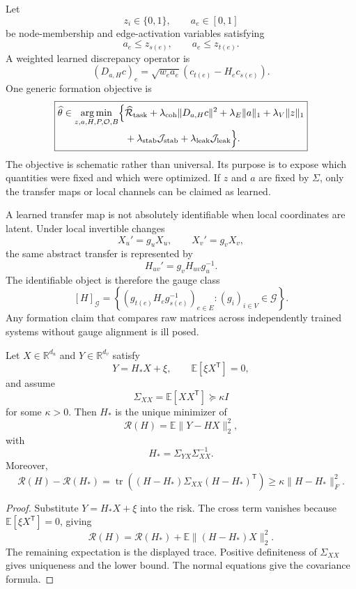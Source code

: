 Let
\[
z_i\in\{0,1\},
\qquad
a_e\in[0,1]
\]
be node-membership and edge-activation variables satisfying
\[
a_e\leq z_{s(e)},
\qquad
a_e\leq z_{t(e)}.
\]
A weighted learned discrepancy operator is
\[
(D_{a,H}c)_e
=
\sqrt{w_ea_e}
\left(
 c_{t(e)}-H_ec_{s(e)}
\right).
\]
One generic formation objective is
\[
\boxed{
\begin{aligned}
\widehat\theta
\in
\operatorname*{arg\,min}_{z,a,H,P,\mathcal O,B}
\Bigl
\{&
\widehat{\mathcal R}_{\mathrm{task}}
+
\lambda_{\mathrm{coh}}\|D_{a,H}c\|^2
+
\lambda_E\|a\|_1
+
\lambda_V\|z\|_1\\
&+
\lambda_{\mathrm{stab}}\mathcal J_{\mathrm{stab}}
+
\lambda_{\mathrm{leak}}\mathcal J_{\mathrm{leak}}
\Bigr\}.
\end{aligned}
}
\]
The objective is schematic rather than universal. Its purpose is to expose
which quantities were fixed and which were optimized. If \(z\) and \(a\) are
fixed by \(\Sigma\), only the transfer maps or local channels can be claimed as
learned.


A learned transfer map is not absolutely identifiable when local coordinates
are latent. Under local invertible changes
\[
X_u'=g_uX_u,
\qquad
X_v'=g_vX_v,
\]
the same abstract transfer is represented by
\[
H_{uv}'=g_vH_{uv}g_u^{-1}.
\]
The identifiable object is therefore the gauge class
\[
[H]_{\mathcal G}
=
\left\{
(g_{t(e)}H_eg_{s(e)}^{-1})_{e\in E}
:
(g_i)_{i\in V}\in\mathcal G
\right\}.
\]
Any formation claim that compares raw matrices across independently trained
systems without gauge alignment is ill posed.


\begin{theorem}\label{thm:transfer-identification}
Let \(X\in\mathbb R^{d_u}\) and \(Y\in\mathbb R^{d_v}\) satisfy
\[
Y=H_*X+\xi,
\qquad
\mathbb E[\xi X^{\mathsf T}]=0,
\]
and assume
\[
\Sigma_{XX}
=
\mathbb E[XX^{\mathsf T}]
\succeq
\kappa I
\]
for some \(\kappa>0\). Then \(H_*\) is the unique minimizer of
\[
\mathcal R(H)
=
\mathbb E\|Y-HX\|_2^2,
\]
with
\[
\boxed{
H_*
=
\Sigma_{YX}\Sigma_{XX}^{-1}.
}
\]
Moreover,
\[
\boxed{
\mathcal R(H)-\mathcal R(H_*)
=
\operatorname{tr}
\left(
(H-H_*)\Sigma_{XX}(H-H_*)^{\mathsf T}
\right)
\geq
\kappa\|H-H_*\|_F^2.
}
\]
\end{theorem}

\begin{proof}
Substitute \(Y=H_*X+\xi\) into the risk. The cross term vanishes because
\(\mathbb E[\xi X^{\mathsf T}]=0\), giving
\[
\mathcal R(H)
=
\mathcal R(H_*)
+
\mathbb E\|(H-H_*)X\|_2^2.
\]
The remaining expectation is the displayed trace. Positive definiteness of
\(\Sigma_{XX}\) gives uniqueness and the lower bound. The normal equations
give the covariance formula.
\end{proof}

